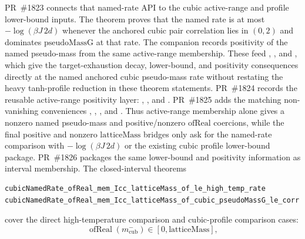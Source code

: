 \documentclass[a4paper,11pt]{article}
\begin{document}
PR~\#1823 connects that named-rate API to the cubic active-range and profile
lower-bound inputs.  The theorem
proves that the named rate is at most \(-\log(\beta J\,2d)\) whenever the
anchored cubic pair correlation lies in \((0,2)\) and dominates
\(\mathrm{pseudoMassG}\) at that rate.  The companion
 records
positivity of the named pseudo-mass from the same active-range membership.
These feed
,
,
and
,
which give the target-exhaustion decay, lower-bound, and positivity
consequences directly at the named anchored cubic pseudo-mass rate without
restating the heavy tanh-profile reduction in these theorem statements.
PR~\#1824 records the reusable active-range positivity layer:
,
,
and
.
PR~\#1825 adds the matching non-vanishing conveniences
,
,
,
and
.
Thus active-range membership alone gives a nonzero named pseudo-mass and
positive/nonzero \(\mathrm{ofReal}\) coercions, while the final positive and
nonzero \(\mathrm{latticeMass}\) bridges only ask for the named-rate comparison
with \(-\log(\beta J\,2d)\) or the existing cubic profile lower-bound package.
PR~\#1826 packages the same lower-bound and positivity information as interval
membership.  The closed-interval theorems
\begin{Verbatim}[breaklines=true,breakanywhere=true]
cubicNamedRate_ofReal_mem_Icc_latticeMass_of_le_high_temp_rate
cubicNamedRate_ofReal_mem_Icc_latticeMass_of_cubic_pseudoMassG_le_corr
\end{Verbatim}
cover the direct high-temperature comparison and cubic-profile comparison cases:
\[
  \operatorname{ofReal}(m^-_{\mathrm{cub}}) \in
  [0,\mathrm{latticeMass}],
\]
\end{document}

